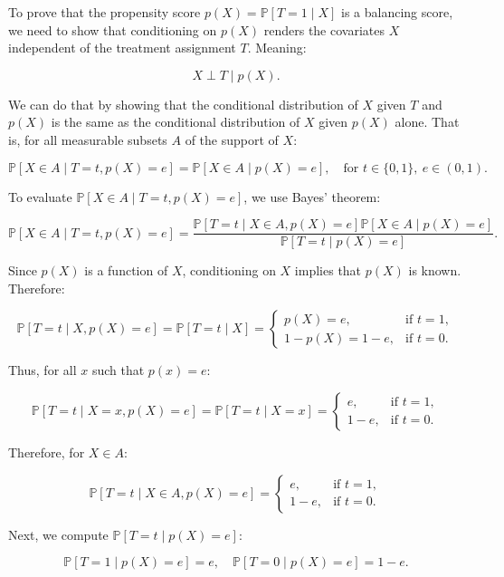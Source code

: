 \documentclass{article}
\begin{document}
To prove that the propensity score \( p(X) = \mathbb{P}[T = 1 \mid X] \) is a balancing score, we need to show that conditioning on \( p(X) \) renders the covariates \( X \) independent of the treatment assignment \( T \). Meaning:

\[
X \perp T \mid p(X).
\]

We can do that by showing that the conditional distribution of \( X \) given \( T \) and \( p(X) \) is the same as the conditional distribution of \( X \) given \( p(X) \) alone. That is, for all measurable subsets \( A \) of the support of \( X \):

\[
\mathbb{P}[X \in A \mid T = t, p(X) = e] = \mathbb{P}[X \in A \mid p(X) = e], \quad \text{for } t \in \{0,1\}, \ e \in (0,1).
\]

To evaluate \( \mathbb{P}[X \in A \mid T = t, p(X) = e] \), we use Bayes' theorem:

\[
\mathbb{P}[X \in A \mid T = t, p(X) = e] = \frac{\mathbb{P}[T = t \mid X \in A, p(X) = e] \mathbb{P}[X \in A \mid p(X) = e]}{\mathbb{P}[T = t \mid p(X) = e]}.
\]

Since \( p(X) \) is a function of \( X \), conditioning on \( X \) implies that \( p(X) \) is known. Therefore:

\[
\mathbb{P}[T = t \mid X, p(X) = e] = \mathbb{P}[T = t \mid X] = 
\begin{cases}
p(X) = e, & \text{if } t = 1, \\
1 - p(X) = 1 - e, & \text{if } t = 0.
\end{cases}
\]

Thus, for all \( x \) such that \( p(x) = e \):

\[
\mathbb{P}[T = t \mid X = x, p(X) = e] = \mathbb{P}[T = t \mid X = x] = 
\begin{cases}
e, & \text{if } t = 1, \\
1 - e, & \text{if } t = 0.
\end{cases}
\]

Therefore, for \( X \in A \):

\[
\mathbb{P}[T = t \mid X \in A, p(X) = e] = 
\begin{cases}
e, & \text{if } t = 1, \\
1 - e, & \text{if } t = 0.
\end{cases}
\]

Next, we compute \( \mathbb{P}[T = t \mid p(X) = e] \):

\[
\mathbb{P}[T = 1 \mid p(X) = e] = e, \quad \mathbb{P}[T = 0 \mid p(X) = e] = 1 - e.
\]
\end{document}
